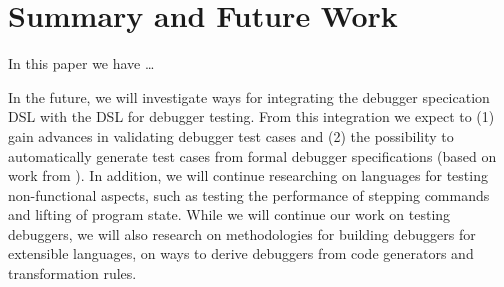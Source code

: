 \section{Summary and Future Work}

In this paper we have \ldots

In the future, we will investigate ways for integrating the debugger specication
\ac{DSL} with the \ac{DSL} for debugger testing. From this integration we
expect to (1) gain advances in validating debugger test cases and
(2) the possibility to automatically generate test cases from formal debugger 
specifications (based on work from \cite{conf/kbse/WuG05,henriques05}).
In addition, we will continue researching on languages for testing
non-functional aspects, such as testing the performance of stepping commands and
lifting of program state.
While we will continue our work on testing debuggers, we will also
research on methodologies for building debuggers for extensible
languages, \ie on ways to derive debuggers from code generators and
transformation rules.